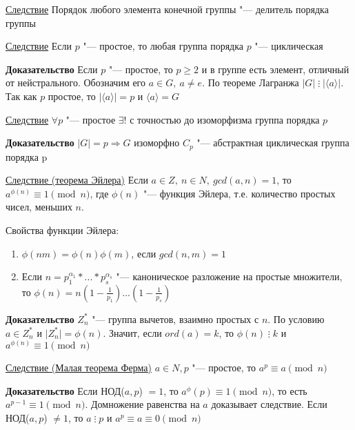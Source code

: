 \documentclass{article}
\begin{document}
\underline{Следствие}
Порядок любого элемента конечной группы "--- делитель порядка группы

\vspace{10pt}

\underline{Следствие}
Если $p$ "--- простое, то любая группа порядка $p$ "--- циклическая

\vspace{5pt}

\textbf{Доказательство}
Если $p$ "--- простое, то $p \geq 2$ и в группе есть элемент, отличный от нейстрального. Обозначим его $a \in G, \  a \neq e$. По теореме Лагранжа $ |G| \mathrel{\vdots}  | \langle a \rangle  |$. Так как $p$ простое, то $ | \langle a \rangle | = p$ и $\langle a \rangle = G$ 

\vspace{10pt}

\underline{Следствие}
$\forall p$ "--- простое $\exists !$ с точностью до изоморфизма группа порядка $p$

\vspace{5pt}

\textbf{Доказательство}
$|G| = p \Rightarrow G$ изоморфно $C_p$ "--- абстрактная циклическая группа порядка p

\vspace{10pt}

\underline{Следствие (теорема Эйлера)}
Если $a \in Z,\  n \in N,\  gcd(a, n) = 1$, то $a^{\phi(n)} \equiv 1 \pmod n$, где $\phi(n)$ "--- функция Эйлера, т.е. количество простых чисел, меньших $n$. 

Свойства функции Эйлера:

\begin{enumerate}
	\item $\phi(nm) = \phi(n)\phi(m)$, если $gcd(n,m) = 1$
	\item Если $n = p_1^{\alpha_1}*...*p_s^{\alpha_s}$ "--- каноническое разложение на простые множители, то $\phi(n) = n(1 - \frac{1}{p_1})...(1 - \frac{1}{p_s})$
\end{enumerate}


\textbf{Доказательство}
$Z_n^*$ "--- группа вычетов, взаимно простых с $n$. По условию $a \in Z_n^*$ и $\mid Z_n^* \mid = \phi(n)$. Значит, если $ord(a) = k$, то $\phi(n) \mathrel{\vdots} k$ и $a^{\phi(n)} \equiv 1 \pmod n$

\vspace{10pt}

\underline{Следствие (Малая теорема Ферма)}
$a \in N, p$ "--- простое, то $a^p \equiv a \pmod n$

\textbf{Доказательство}
Если НОД($a,p$) $= 1$, то $a^\phi(p) \equiv 1 \pmod n$, то есть $a^{p-1} \equiv 1 \pmod n$. Домножение равенства на $a$ доказывает следствие. Если НОД($a,p$) $\neq 1$, то $a \mathrel{\vdots} p$ и $a^p \equiv a \equiv 0 \pmod n$
\end{document}
